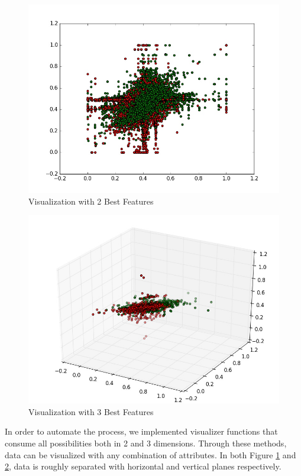\documentclass[conference]{IEEEtran}
\begin{document}
\begin{figure}[H]
	\includegraphics[width=1\columnwidth]{best_2features.jpg}
	\caption{Visualization with 2 Best Features}
	\label{2plot}
\end{figure}
\begin{figure}[H]
	\includegraphics[width=1\columnwidth]{3_6_8viz.jpg}
	\caption{Visualization with 3 Best Features}
	\label{3plot}
\end{figure}	
In order to automate the process, we implemented visualizer functions that consume all possibilities both in 2 and 3 dimensions. Through these methods, data can be visualized with any combination of attributes. In both Figure \ref{2plot} and \ref{3plot}, data is roughly separated with horizontal and vertical planes respectively.\\
\end{document}
